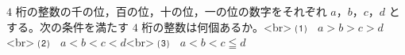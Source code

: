 $4$ 桁の整数の千の位，百の位，十の位，一の位の数字をそれぞれ $a$，$b$，$c$，$d$ とする。次の条件を満たす $4$ 桁の整数は何個あるか。<br>
⑴　$a > b > c > d$<br>
⑵　$a < b < c < d$<br>
⑶　$a < b < c \leqq d$
